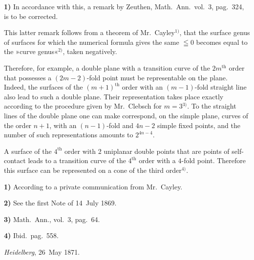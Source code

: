 \documentclass{article}
\begin{document}
\textbf{1)} In accordance with this, a remark by Zeuthen, Math.\ Ann.\ vol.\ 3, pag.\ 324, is to be corrected.

This latter remark follows from a theorem of Mr.~Cayley${}^{1)}$, that the surface genus of surfaces for which the numerical formula gives the same $\leqq 0$ becomes equal to the »curve genus«${}^{2)}$, taken negatively.

Therefore, for example, a double plane with a transition curve of the $2m^{\text{th}}$ order that possesses a $(2m-2)$-fold point must be representable on the plane. Indeed, the surfaces of the $(m+1)^{\text{th}}$ order with an $(m-1)$-fold straight line also lead to such a double plane. Their representation takes place exactly according to the procedure given by Mr.~Clebsch for $m = 3$${}^{3)}$. To the straight lines of the double plane one can make correspond, on the simple plane, curves of the order $n+1$, with an $(n-1)$-fold and $4n-2$ simple fixed points, and the number of such representations amounts to $2^{4n-4}$.

A surface of the $4^{\text{th}}$ order with 2 uniplanar double points that are points of self-contact leads to a transition curve of the $4^{\text{th}}$ order with a $4$-fold point. Therefore this surface can be represented on a cone of the third order${}^{4)}$.

\textbf{1)} According to a private communication from Mr.~Cayley.

\textbf{2)} See the first Note of 14~July 1869.

\textbf{3)} Math.\ Ann., vol.\ 3, pag.\ 64.

\textbf{4)} Ibid.\ pag.\ 558.

\emph{Heidelberg}, 26~May 1871.
\end{document}
